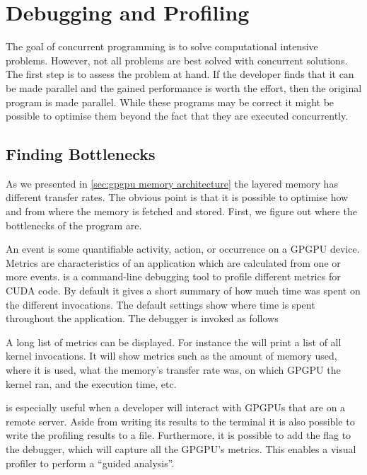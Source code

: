 \section{Debugging and Profiling}
\label{sec:debugging and profiling}

The goal of concurrent programming is to solve computational intensive problems.
However, not all problems are best solved with concurrent solutions.
The first step is to assess the problem at hand.
If the developer finds that it can be made parallel and the gained performance is worth the effort, then the original program is made parallel.
While these programs may be correct it might be possible to optimise them beyond the fact that they are executed concurrently.~\cite{nvidia2015doc}

\subsection{Finding Bottlenecks}
\label{sec:finding bottlenecks}

As we presented in \cref{sec:gpgpu memory architecture} the layered memory has different transfer rates.
The obvious point is that it is possible to optimise how and from where the memory is fetched and stored.
First, we figure out where the bottlenecks of the program are.~\cite{farber2011cuda}

An event is some quantifiable activity, action, or occurrence on a GPGPU device.
Metrics are characteristics of an application which are calculated from one or more events.
 is a command-line debugging tool to profile different metrics for CUDA code.
By default it gives a short summary of how much time was spent on the different invocations.
The default settings show where time is spent throughout the application.
The debugger is invoked as follows
%
\begin{quote}
\end{quote}
%
A long list of metrics can be displayed.
For instance the  will print a list of all kernel invocations.
It will show metrics such as the amount of memory used, where it is used, what the memory's transfer rate was, on which GPGPU the kernel ran, and the execution time, etc.~\cite{profiling2015doc}

 is especially useful when a developer will interact with GPGPUs that are on a remote server.
Aside from writing its results to the terminal it is also possible to write the profiling results to a file.
Furthermore, it is possible to add the  flag to the debugger, which will capture all the GPGPU's metrics.
This enables a visual profiler to perform a ``guided analysis''.~\cite{nvprof2013tips}

